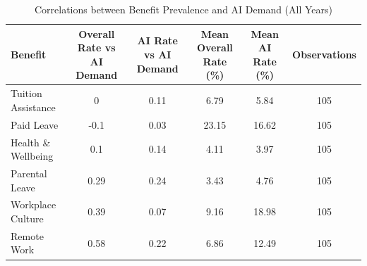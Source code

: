 \begin{table}[htbp]
\caption{Correlations between Benefit Prevalence and AI Demand (All Years)}
\label{tab:benefit_ai_demand_corr}
\begin{tabular}{lccccc}
\hline\hline
Benefit & Overall Rate vs AI Demand & AI Rate vs AI Demand & Mean Overall Rate (\%) & Mean AI Rate (\%) & Observations \\
\hline
Tuition Assistance & 0 & 0.11 & 6.79 & 5.84 & 105 \\
Paid Leave & -0.1 & 0.03 & 23.15 & 16.62 & 105 \\
Health \& Wellbeing & 0.1 & 0.14 & 4.11 & 3.97 & 105 \\
Parental Leave & 0.29 & 0.24 & 3.43 & 4.76 & 105 \\
Workplace Culture & 0.39 & 0.07 & 9.16 & 18.98 & 105 \\
Remote Work & 0.58 & 0.22 & 6.86 & 12.49 & 105 \\
\hline\hline
\end{tabular}
\end{table}
